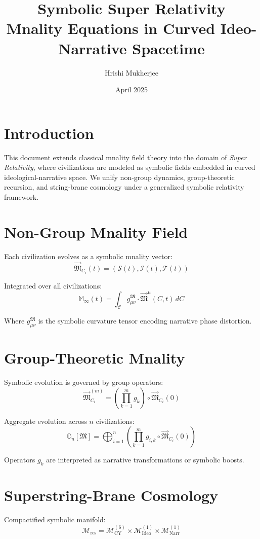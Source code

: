 \documentclass{article}
\title{\Huge Symbolic Super Relativity\\ \Large Mnality Equations in Curved Ideo-Narrative Spacetime}
\author{Hrishi Mukherjee}
\date{April 2025}
\begin{document}
\maketitle

\section{Introduction}
This document extends classical mnality field theory into the domain of \textit{Super Relativity}, where civilizations are modeled as symbolic fields embedded in curved ideological-narrative space. We unify non-group dynamics, group-theoretic recursion, and string-brane cosmology under a generalized symbolic relativity framework.

\section{Non-Group Mnality Field}
Each civilization evolves as a symbolic mnality vector:
\[
\vec{\mathfrak{M}}_{C_i}(t) = (\mathcal{S}(t), \mathcal{I}(t), \mathcal{T}(t))
\]

Integrated over all civilizations:
\[
\mathbb{M}_{\infty}(t) = \int_{\mathcal{C}} g_{\mu\nu}^{\mathfrak{M}} \cdot \vec{\mathfrak{M}}^{\mu}(C, t) \, dC
\]

Where \( g_{\mu\nu}^{\mathfrak{M}} \) is the symbolic curvature tensor encoding narrative phase distortion.

\section{Group-Theoretic Mnality}
Symbolic evolution is governed by group operators:
\[
\vec{\mathfrak{M}}_{C_i}^{(m)} = \left( \prod_{k=1}^m g_k \right) \circ \vec{\mathfrak{M}}_{C_i}(0)
\]

Aggregate evolution across \( n \) civilizations:
\[
\mathbb{G}_n[\mathfrak{M}] = \bigoplus_{i=1}^{n} \left( \prod_{k=1}^{m} g_{i,k} \circ \vec{\mathfrak{M}}_{C_i}(0) \right)
\]

Operators \( g_k \) are interpreted as narrative transformations or symbolic boosts.

\section{Superstring-Brane Cosmology}
Compactified symbolic manifold:
\[
\mathcal{M}_{\text{res}} = \mathcal{M}_{\text{CY}}^{(6)} \times \mathcal{M}_{\text{Ideo}}^{(1)} \times \mathcal{M}_{\text{Narr}}^{(1)}
\]
\end{document}
